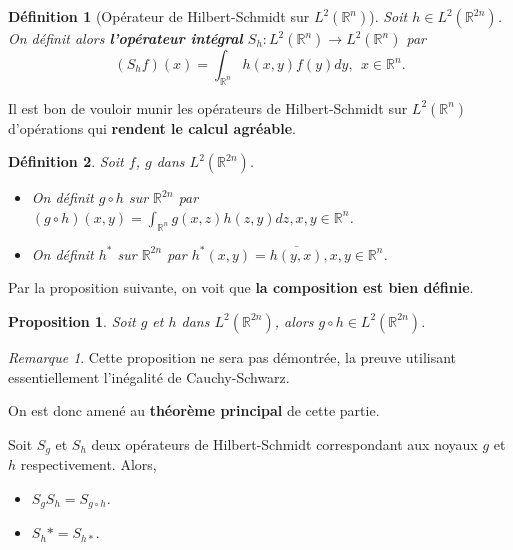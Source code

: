 \documentclass[a4paper, 12pt]{report}
\newcommand{\R}{\mathbb{R}} %
\newcommand{\ra}[1][]{\overset{#1}{\rightarrow}} %
\renewcommand{\.}{\cdot} %
\theoremstyle{break}
\newtheorem{definition}{Définition}
\newtheorem{proposition}{Proposition}
\theoremstyle{remark}
\newtheorem{remark}{Remarque}
\theoremstyle{proofstyle}
\begin{document}
\begin{definition}[Opérateur de Hilbert-Schmidt sur $L^2(\R^n)$]
    Soit $h \in L^2(\R^{2n})$. On définit alors \textbf{l'opérateur intégral} $S_h : L^2(\R^n) \ra L^2(\R^n)$ par
    $$(S_hf)(x) = \int_{\R^n} h(x,y)f(y)dy, ~~ x \in \R^n.$$
\end{definition}

Il est bon de vouloir munir les opérateurs de Hilbert-Schmidt sur $L^2(\R^n)$ d'opérations qui \textbf{rendent le calcul agréable}.

\begin{definition}
    Soit $f$, $g$ dans $L^2(\R^{2n})$.
    \begin{itemize}
        \item On définit $g \circ h$ sur $\R^{2n}$ par $(g \circ h)(x,y) = \int_{\R^n} g(x,z)h(z,y)dz, x, y \in \R^n$.
        \item On définit $h^*$ sur $\R^{2n}$ par $h^*(x,y) = \overline{h(y,x)}, x, y \in \R^n$.
    \end{itemize}
\end{definition}

Par la proposition suivante, on voit que \textbf{la composition est bien définie}.

\begin{proposition}
    Soit $g$ et $h$ dans $L^2(\R^{2n})$, alors $g \circ h \in L^2(\R^{2n})$.
\end{proposition}
\begin{remark}
    Cette proposition ne sera pas démontrée, la preuve utilisant essentiellement l'inégalité de Cauchy-Schwarz.
\end{remark}

On est donc amené au \textbf{théorème principal} de cette partie.

\begin{theorem}
    Soit $S_g$ et $S_h$ deux opérateurs de Hilbert-Schmidt correspondant aux noyaux $g$ et $h$ respectivement. Alors,
    \begin{itemize}
        \item $S_g S_h = S_{g \circ h}$.
        \item $S_h* = S_{h*}$.
    \end{itemize}
\end{theorem}
\end{document}
